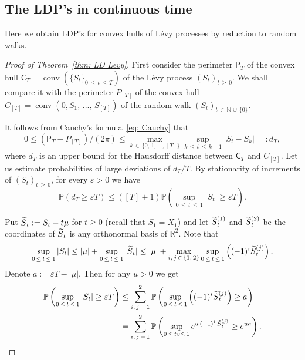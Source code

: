 \documentclass[10pt]{amsart}
\theoremstyle{definition}\newtheorem{defi}[theo]{Definition}\newtheorem{rema}[theo]{Remark}\newtheorem{exam}[theo]{Example}\newtheorem{exem}[theo]{Example}\newtheorem{nota}[theo]{Notation}
\DeclareMathOperator{\conv}{conv}
\newcommand{\Rbb}{\mathbb{R}}
\newcommand{\N}{\mathbb{N}}
\newcommand{\Pbb}{\mathbb{P}}
\newcommand{\sfC}{\mathsf{C}}
\newcommand{\sfP}{\mathsf{P}}
\let\oldtilde\tilde
\renewcommand*{\tilde}[1]{\mathchoice{\widetilde{#1}}{\widetilde{#1}}{\oldtilde{#1}}{\oldtilde{#1}}}
\begin{document}
\subsection{The LDP's in continuous time} \label{sec: continuous time proof}
Here we obtain LDP's for convex hulls of L\'evy processes by reduction to random walks.

\begin{proof}[Proof of Theorem~\ref{thm: LD Levy}]
First consider the perimeter $\sfP_T$ of the convex hull $\sfC_T= \conv(\{S_t\}_{0\,\le\,t\,\le\,T}) $ of the L\'evy process $(S_t)_{t\,\ge\,0}$. We shall compare it with the perimeter $P_{[T]}$ of the convex hull $C_{[T]}=\conv(0, S_1,\, \ldots,\,S_{[T]})$ of the random walk $(S_t)_{t\,\in\,\N\,\cup\, \{0\}}$.

It follows from Cauchy's formula~\eqref{eq: Cauchy} that
\[
0 \le \left(\sfP_T - P_{[T]}\right)/(2 \pi) \le \max_{k\,\in\, \{0,\,1,\,\ldots,\,[T]\}} \sup_{k\,\le\,t\,\le\,k+1}\left|S_t - S_k\right| =:d_T,
\]
where $d_T$ is an upper bound for the Hausdorff distance between $\sfC_T$ and $C_{[T]}$. Let us estimate probabilities of large deviations of $d_T/T$. By stationarity of increments of $(S_t)_{t\,\ge\,0}$, for every $\varepsilon>0$ we have
\[
\Pbb \left(d_T\ge \varepsilon T \right) \le ([T] +1) \Pbb \left(\sup_{0\,\le\,t\,\le\,1} |S_t | \ge \varepsilon T \right).
\]

Put $\tilde S_t :=S_t - t \mu$ for $t \ge 0$ (recall that $S_1 = X_1$) and let $\tilde S_t^{(1)}$ and $\tilde S_t^{(2)}$ be the coordinates of $\tilde S_t$ is any orthonormal basis of $\Rbb^2$. Note that
\[
\sup_{0\,\le\,t\,\le\,1} |S_t | \le |\mu| + \sup_{0\,\le\,t\,\le \,1} |\tilde S_t | \le |\mu| + \max_{i,\,j\,\in\,\{1,\,2\}} \sup_{0\,\le\,t\,\le\,1} \left((-1)^i \tilde S_t^{(j)} \right).
\]
Denote $a:= \varepsilon T- |\mu|$. Then for any $u>0$ we get
\begin{align*}
\Pbb \left(\sup_{0\,\le\,t\,\le\,1} |S_t | \ge \varepsilon T \right) &\le \sum_{i,\,j\,=\,1}^2 \Pbb \left(\sup_{0\,\le\,t\, \le\,1} \left((-1)^i \tilde S_t^{(j)} \right) \ge a \right) \\
&= \sum_{i,\,j\,=\,1}^2 \Pbb \left(\sup_{0\,\le\,tv\le\,1} e^{u \,(-1)^i\,\tilde S_t^{(j)}} \ge e^{u a} \right).
\end{align*}


\end{proof}
\end{document}
